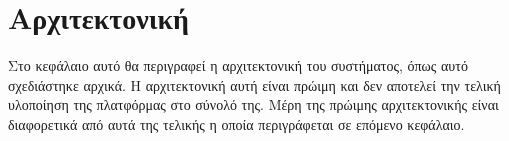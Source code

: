 \section{Αρχιτεκτονική} \label{section:3-6-design-architecture}

Στο κεφάλαιο αυτό θα περιγραφεί η αρχιτεκτονική του συστήματος, όπως αυτό σχεδιάστηκε αρχικά. Η αρχιτεκτονική αυτή είναι πρώιμη και δεν αποτελεί την τελική υλοποίηση της πλατφόρμας στο σύνολό της. Μέρη της πρώιμης αρχιτεκτονικής είναι διαφορετικά από αυτά της τελικής η οποία περιγράφεται σε επόμενο κεφάλαιο.
